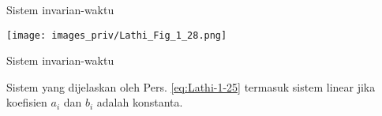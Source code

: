 \begin{frame}{Sistem invarian-waktu}

{\centering
\texttt{[image: images\_priv/Lathi\_Fig\_1\_28.png]}
\par}

\end{frame}


\begin{frame}{Sistem invarian-waktu}

Sistem yang dijelaskan oleh Pers. \eqref{eq:Lathi-1-25} termasuk sistem linear jika
koefisien $a_i$ dan $b_i$ adalah konstanta.

\end{frame}
